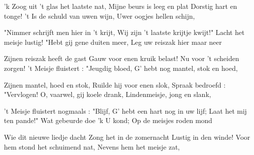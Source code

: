 \footnotemark [
ititle={Lindemeisje, het},
tu={Keinen Tropfen im Becher mehr (Auteur : Fr. Abt)}]


\beginverse
'k Zoog uit 't glas het laatste nat,
Mijne beurs is leeg en plat
Dorstig hart en tonge!
't Is de schuld van uwen wijn,
Uwer oogjes hellen schijn,
\endverse

\beginverse
"Nimmer schrijft men hier in 't krijt,
Wij zijn 't laatste krijtje kwijt!"
Lacht het meisje lustig!
"Hebt gij gene duiten meer,
Leg uw reiszak hier maar neer
\endverse

\beginverse
Zijnen reiszak heeft de gast
Gauw voor enen kruik belast!
Nu voor 't scheiden zorgen!
't Meisje fluistert : "Jeugdig bloed,
G' hebt nog mantel, stok en hoed,
\endverse

\beginverse
Zijnen mantel, hoed en stok,
Ruilde hij voor enen slok,
Spraak bedroefd : "Vervlogen!
O, vaarwel, gij koele drank,
Lindenmeisje, jong en slank,
\endverse

\beginverse
't Meisje fluistert nogmaals : "Blijf,
G' hebt een hart nog in uw lijf;
Laat het mij ten pande!"
Wat gebeurde doe 'k U kond;
Op de meisjes roden mond
\endverse

\beginverse
Wie dit nieuwe liedje dacht
Zong het in de zomernacht
Lustig in den winde!
Voor hem stond het schuimend nat,
Nevens hem het meisje zat,
\endverse
\endsong